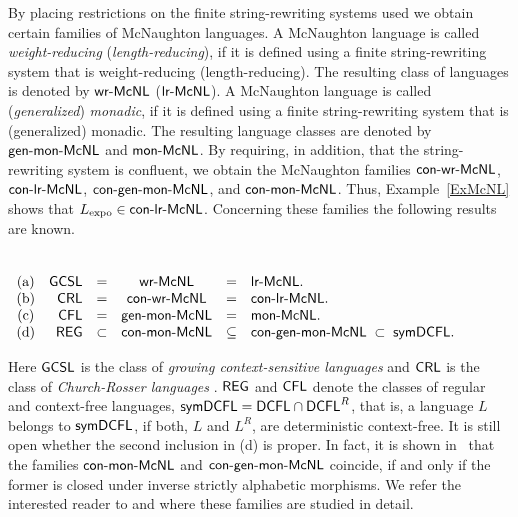 By placing restrictions on the finite string-rewriting systems used we obtain certain families of McNaughton languages. A McNaughton language is called \emph{weight-reducing} (\emph{length-reducing}), if it is defined using a finite string-rewriting system that is weight-reducing (length-reducing). The resulting class of languages is denoted by \index{$\wrMcNL$}$\wrMcNL$ (\index{$\lrMcNL$}$\lrMcNL$). A McNaughton language is called (\emph{generalized}) \emph{monadic}, if it is defined using a finite string-rewriting system that is (generalized) monadic. The resulting language classes are denoted by \index{$\genmonMcNL$}$\genmonMcNL$ and \index{$\monMcNL$}$\monMcNL$. By requiring, in addition, that the string-rewriting system is confluent, we obtain the McNaughton families \index{$\conwrMcNL$}$\conwrMcNL$, \index{$\conlrMcNL$}$\conlrMcNL$, \index{$\congenmonMcNL$}$\congenmonMcNL$, and \index{$\conmonMcNL$}$\conmonMcNL$. Thus, Example~\ref{ExMcNL} shows that $L_{\rm expo}\in \textup{\sf con-lr-McNL}$. Concerning these families the following results are known.

\begin{theorem}{\rm \cite{Beaudry2003,Leupold2011}}\label{ThmMcNL}\\[+0.2cm]
$\begin{array}[t]{crcccl}
{\rm (a)} & \textup{\sf GCSL} & = & \textup{\sf wr-McNL} & = & \textup{\sf lr-McNL}.\\
{\rm (b)} & \textup{\sf CRL}  & = & \textup{\sf con-wr-McNL} & = & \textup{\sf con-lr-McNL}.\\
{\rm (c)} & \textup{\sf CFL}  & = & \textup{\sf gen-mon-McNL} & = & \textup{\sf mon-McNL}.\\
{\rm (d)} & \textup{\sf REG}  & \subset & \textup{\sf con-mon-McNL} & \subseteq & \textup{\sf con-gen-mon-McNL}\; \subset\; \textup{\sf symDCFL}.
\end{array}$
\end{theorem}

Here \index{$\GCSL$}$\GCSL$ is the class of \emph{growing context-sensitive languages} \cite{Buntrock19981,Dahlhaus1986} and \index{$\CRL$}$\CRL$ is the class of \emph{Church-Rosser languages} \cite{MNO88}. \index{$\Reg$}$\Reg$ and \index{$\CFL$}$\CFL$ denote the classes of regular and context-free languages, \index{$\symDCFL$}$\textup{\sf symDCFL} = \textup{\sf DCFL}\cap\textup{\sf DCFL}^R$, that is, a language $L$ belongs to $\symDCFL$, if both, $L$ and $L^R$, are deterministic context-free. It is still open whether the second inclusion in (d) is proper. In fact, it is shown in~\cite{Leupold2011} that the families $\conmonMcNL$ and $\congenmonMcNL$ coincide, if and only if the former is closed under inverse strictly alphabetic morphisms. We refer the interested reader to \cite{Beaudry2003} and \cite{Leupold2011} where these families are studied in detail. 

